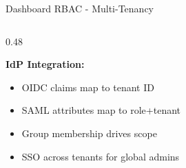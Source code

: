 \begin{frame}{Dashboard RBAC - Multi-Tenancy}
\begin{columns}[T]
\begin{column}{0.48\textwidth}
      \vspace{0.15cm}

      \textbf{IdP Integration:}
      \begin{itemize}
        \item OIDC claims map to tenant ID
        \item SAML attributes map to role+tenant
        \item Group membership drives scope
        \item SSO across tenants for global admins
      \end{itemize}
    \end{column}
  \end{columns}
\end{frame}
